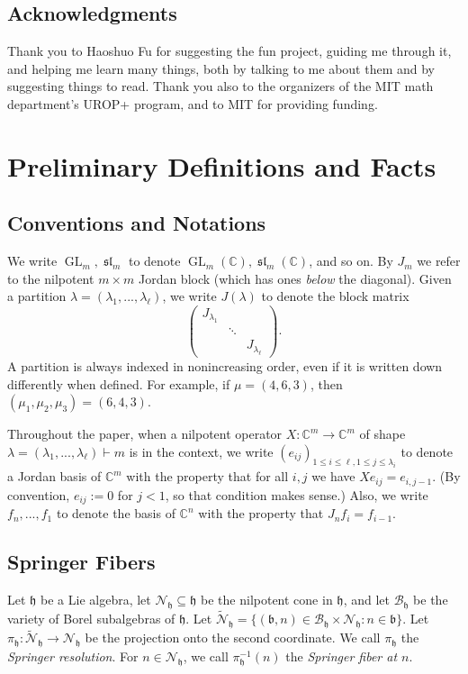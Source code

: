 \documentclass[12pt,psamsfonts]{article}
\DeclareMathOperator{\GL}{GL}
\DeclareMathOperator{\spl}{\mathfrak{sl}}
\begin{document}
\subsection{Acknowledgments}
Thank you to Haoshuo Fu for suggesting the fun project, guiding me through it, and helping me learn many things, both by talking to me about them and by suggesting things to read.
Thank you also to the organizers of the MIT math department's UROP+ program, and to MIT for providing funding.

\section{Preliminary Definitions and Facts}\label{prelim}
\subsection{Conventions and Notations}
We write \(\GL_m, \spl_m\) to denote \(\GL_m(\mathbb{C}), \spl_m(\mathbb{C})\), and so on.
By \(J_m\) we refer to the nilpotent \(m \times m\) Jordan block (which has ones \emph{below} the diagonal).
Given a partition \(\lambda = (\lambda_1, ..., \lambda_\ell)\), we write \(J(\lambda)\) to denote the block matrix
\[\begin{pmatrix}
    J_{\lambda_1} \\
    & \ddots \\
    & & J_{\lambda_\ell}
\end{pmatrix}.\]
A partition is always indexed in nonincreasing order, even if it is written down differently when defined.
For example, if \(\mu = (4, 6, 3)\), then \((\mu_1, \mu_2, \mu_3) = (6, 4, 3)\).
\par Throughout the paper, when a nilpotent operator \(X : \mathbb{C}^m \to \mathbb{C}^m\) of shape \(\lambda = (\lambda_1, ..., \lambda_\ell) \vdash m\) is in the context, we write \((e_{ij})_{1 \leq i \leq \ell, 1 \leq j \leq \lambda_i}\) to denote a Jordan basis of \(\mathbb{C}^m\) with the property that for all \(i,j\) we have \(Xe_{ij} = e_{i,j - 1}\).
(By convention, \(e_{ij} := 0\) for \(j < 1\), so that condition makes sense.)
Also, we write \(f_n, ..., f_1\) to denote the basis of \(\mathbb{C}^n\) with the property that \(J_n f_i = f_{i - 1}\).

\subsection{Springer Fibers}
Let \(\mathfrak{h}\) be a Lie algebra, let \(\mathcal{N}_\mathfrak{h} \subseteq \mathfrak{h}\) be the nilpotent cone in \(\mathfrak{h}\), and let \(\mathcal{B}_\mathfrak{h}\) be the variety of Borel subalgebras of \(\mathfrak{h}\).
Let \(\widetilde{\mathcal{N}}_\mathfrak{h} = \{(\mathfrak{b}, n) \in \mathcal{B}_\mathfrak{h} \times \mathcal{N}_\mathfrak{h} : n \in \mathfrak{b}\}\).
Let \(\pi_\mathfrak{h} : \widetilde{\mathcal{N}}_\mathfrak{h} \to \mathcal{N}_\mathfrak{h}\) be the projection onto the second coordinate.
We call \(\pi_\mathfrak{h}\) the \emph{Springer resolution}.
For \(n \in \mathcal{N}_\mathfrak{h}\), we call \(\pi_\mathfrak{h}^{-1}(n)\) the \emph{Springer fiber at \(n\)}.
\end{document}
